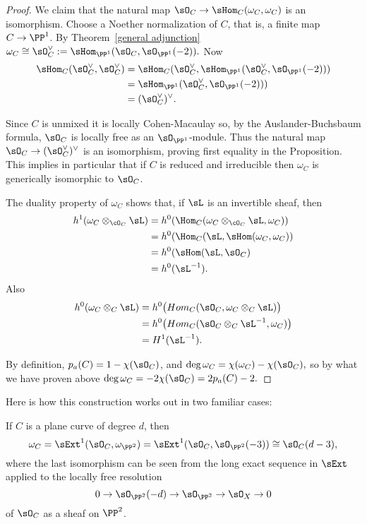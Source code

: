 \begin{proof}
 We claim that the natural map $\sO_C \to \sHom_C(\omega_C, \omega_C)$ is an isomorphism. Choose a Noether
normalization of $C$, that is, a finite map $C\to \PP^1$.
By Theorem~\ref{general adjunction} $\omega_C \cong \sO_C^\vee := \sHom_{\PP^1}(\sO_C,\sO_{\PP^1}(-2)).$
Now
$$
\begin{aligned}
\sHom_{C}(\sO_C^\vee,\sO_C^\vee ) &=\sHom_{C}(\sO_C^\vee, \sHom_{\PP^1}(\sO_C^\vee,\sO_{\PP^1}(-2)))\\
&= \sHom_{\PP^1}(\sO_C^\vee, \sO_{\PP^1}(-2)))\\
&= (\sO_C^\vee)^\vee.
\end{aligned}
$$

Since $C$ is unmixed it is locally Cohen-Macaulay so, by the Auslander-Buchsbaum formula, 
$\sO_C$ is locally free as an $\sO_{\PP^1}$-module.
Thus the natural map $\sO_C \to (\sO_C^\vee)^\vee$ is an isomorphism, proving first equality in the Proposition.
This implies in particular that if $C$ is reduced and irreducible then $\omega_C$ is generically isomorphic to $\sO_C$.

 The duality property of $\omega_C$ shows that, if $\sL$ is an invertible sheaf, then
$$
\begin{aligned}
h^1(\omega_C \otimes_{\cO_C} \sL) &= h^0(\Hom_C(\omega_C\otimes_{\cO_C} \sL, \omega_C))\\
&= h^0(\Hom_C(\sL, \sHom(\omega_C,\omega_C))\\
&=h^0 (\sHom(\sL, \sO_C)\\
&= h^0(\sL^{-1}).
\end{aligned}
$$
Also
$$
\begin{aligned}
h^0(\omega_C\otimes_C\sL) &= h^0 \bigl(Hom_C(\sO_C, \omega_C\otimes_C\sL)\bigr)\\
&=h^0 \bigl(Hom_C(\sO_C\otimes_C\sL^{-1}, \omega_C)\bigr)\\
&=H^1 (\sL^{-1}). 
\end{aligned}
$$

 By definition, $p_a(C) = 1-\chi(\sO_C)$, and 
 $\deg \omega_C = \chi(\omega_C) - \chi(\sO_C),$
 so by what we have proven above
 $\deg \omega_C = -2\chi(\sO_C) = 2p_a(C)-2.$
 \end{proof}

Here is how this construction works out in two familiar cases:

\begin{example}
 If $C$ is a plane curve of degree $d$, then 
$$
\omega_C = \sExt^1(\sO_C, \omega_{\PP^2}) = \sExt^1(\sO_C, \sO_{\PP^2}(-3)) \cong \sO_C(d-3),
$$
where the last isomorphism can be seen from the long exact sequence in $\sExt$ applied
to the locally free resolution
$$
0\to \sO_{\PP^2}(-d) \to \sO_{\PP^2} \to\sO_{X} \to 0
$$
of $\sO_C$ as a sheaf on $\PP^2$. 
\end{example}


